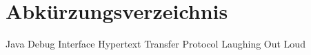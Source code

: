 
\chapter*{Abkürzungsverzeichnis}

\begin{acronym}
  {Java Debug Interface}
  {Hypertext Transfer Protocol}
  {Laughing Out Loud}
\end{acronym}